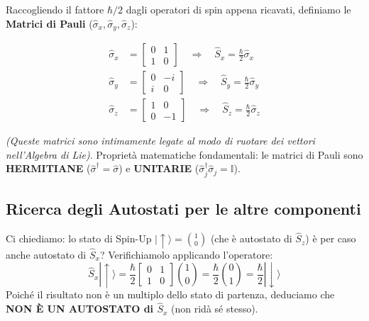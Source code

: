 \documentclass[11pt, a4paper]{article}
\begin{document}
Raccogliendo il fattore $\hbar/2$ dagli operatori di spin appena ricavati, definiamo le \textbf{Matrici di Pauli} ($\hat{\sigma}_x, \hat{\sigma}_y, \hat{\sigma}_z$): %

\begin{align*}
    \hat{\sigma}_x &= \begin{bmatrix} 0 & 1 \\ 1 & 0 \end{bmatrix} \quad \Rightarrow \quad \hat{S}_x = \frac{\hbar}{2} \hat{\sigma}_x \\ %
    \hat{\sigma}_y &= \begin{bmatrix} 0 & -i \\ i & 0 \end{bmatrix} \quad \Rightarrow \quad \hat{S}_y = \frac{\hbar}{2} \hat{\sigma}_y \\ %
    \hat{\sigma}_z &= \begin{bmatrix} 1 & 0 \\ 0 & -1 \end{bmatrix} \quad \Rightarrow \quad \hat{S}_z = \frac{\hbar}{2} \hat{\sigma}_z %
\end{align*}

\noindent
\textit{(Queste matrici sono intimamente legate al modo di ruotare dei vettori nell'Algebra di Lie)}. %
Proprietà matematiche fondamentali: le matrici di Pauli sono \textbf{HERMITIANE} ($\hat{\sigma}^\dagger = \hat{\sigma}$) e \textbf{UNITARIE} ($\hat{\sigma}_j^\dagger \hat{\sigma}_j = \mathbb{I}$). %

\subsection{Ricerca degli Autostati per le altre componenti} %

Ci chiediamo: lo stato di Spin-Up $|\uparrow\rangle = \binom{1}{0}$ (che è autostato di $\hat{S}_z$) è per caso anche autostato di $\hat{S}_x$? Verifichiamolo applicando l'operatore: %
\begin{equation*}
    \hat{S}_x |\uparrow\rangle = \frac{\hbar}{2} \begin{bmatrix} 0 & 1 \\ 1 & 0 \end{bmatrix} \binom{1}{0} = \frac{\hbar}{2} \binom{0}{1} = \frac{\hbar}{2} |\downarrow\rangle %
\end{equation*}
Poiché il risultato non è un multiplo dello stato di partenza, deduciamo che \textbf{NON È UN AUTOSTATO di $\hat{S}_x$} (non ridà sé stesso). %
\end{document}
